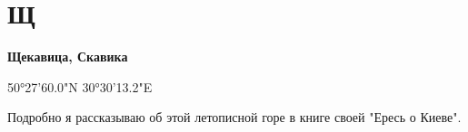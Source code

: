\chapter*{Щ}

\textbf{Щекавица, Скавика}

50°27'60.0"N 30°30'13.2"E

Подробно я рассказываю об этой летописной горе в книге своей "Ересь о Киеве".
